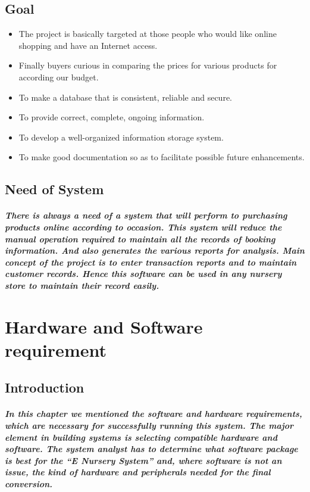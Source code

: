 \documentclass[12pt]{report}
\begin{document}
    \section{Goal}
    \begin{itemize}
        \item The project is basically targeted at those people who would like online shopping and have an   Internet access.
        
        \item Finally buyers curious in comparing the prices for various products for according our budget. 
        
        \item To make a database that is consistent, reliable and secure.
        
        \item To provide correct, complete, ongoing information.
        
        \item To develop a well-organized information storage system.
        
        \item To make good documentation so as to facilitate possible future enhancements.
    \end{itemize}
    \section{Need of System}
    \paragraph
    {
    There is always a need of a system that will perform to purchasing products online according to occasion. This system will reduce the manual operation required to maintain all the records of booking information. And also generates the various reports for analysis. Main concept of the project is to enter transaction reports and to maintain customer records. Hence this software can be used in any nursery store to maintain their record easily.
    }
    \chapter{Hardware and Software requirement}
        \section{Introduction}
        \paragraph
        {
        In this chapter we mentioned the software and hardware requirements, which are necessary for successfully running this system. The major element in building systems is selecting compatible hardware and software. The system analyst has to determine what software package is best for the “E Nursery System” and, where software is not an issue, the kind of hardware and peripherals needed for the final conversion.
        }
\end{document}
